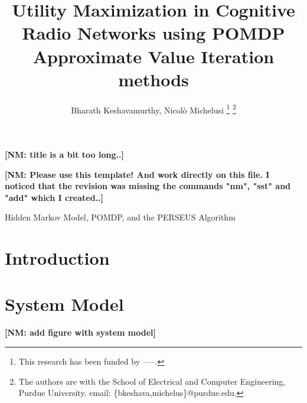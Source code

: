 \documentclass[10pt,twocolumn]{IEEEtran}
\title{Utility Maximization in Cognitive Radio Networks using POMDP Approximate Value Iteration methods}
\author{Bharath Keshavamurthy, Nicol\`{o} Michelusi
\thanks{This research has been funded by -----.}
\thanks{The authors are with the School of Electrical and Computer Engineering, Purdue University. email: \{bkeshava,michelus\}@purdue.edu.}
}
\newcommand{\nm}[1]{{\color{blue}\bf{[NM: #1]}}}
\begin{document}
 
\maketitle
{}
\nm{title is a bit too long..}

\nm{Please use this template! And work directly on this file. I noticed that the revision was missing the commands "nm", "sst" and "add" which I created..}

\begin{abstract}
\end{abstract}

\begin{IEEEkeywords}
Hidden Markov Model, POMDP, and the PERSEUS Algorithm
\end{IEEEkeywords}

\section{Introduction}
\section{System Model}

\nm{add figure with system model}
\end{document}
